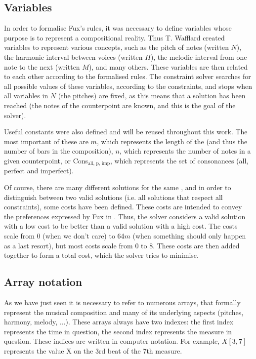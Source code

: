 \subsection{Variables} \label{Wafflard-variables}
In order to formalise Fux's rules, it was necessary to define variables whose purpose is to represent a compositional reality. Thus T. Wafflard created variables to represent various concepts, such as the pitch of notes (written $N$), the harmonic interval between voices (written $H$), the melodic interval from one note to the next (written $M$), and many others. These variables are then related to each other according to the formalised rules. The constraint solver searches for all possible values of these variables, according to the constraints, and stops when all variables in $N$ (the pitches) are fixed, as this means that a solution has been reached (the notes of the counterpoint are known, and this is the goal of the solver).

Useful constants were also defined and will be reused throughout this work. The most important of these are $m$, which represents the length of the \cfs (and thus the number of bars in the composition), $n$, which represents the number of notes in a given counterpoint, or Cons$_{\text{all, p, imp}}$, which represents the set of consonances (all, perfect and imperfect).

Of course, there are many different solutions for the same \cf, and in order to distinguish between two valid solutions (i.e. all solutions that respect all constraints), some costs have been defined. These costs are intended to convey the preferences expressed by Fux in \gap. Thus, the solver considers a valid solution with a low cost to be better than a valid solution with a high cost. The costs scale from 0 (when we don't care) to 64$m$ (when something should only happen as a last resort), but most costs scale from 0 to 8. These costs are then added together to form a total cost, which the solver tries to minimise.

\subsection{Array notation}
As we have just seen it is necessary to refer to numerous arrays, that formally represent the musical composition and many of its underlying aspects (pitches, harmony, melody, ...). These arrays always have two indexes: the first index represents the time in question, the second index represents the measure in question. These indices are written in computer notation. For example, $X[3, 7]$ represents the value X on the 3rd beat of the 7th measure.

